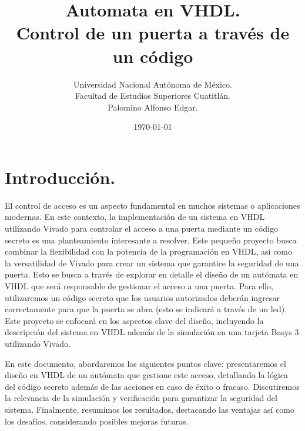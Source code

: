 \documentclass[a4paper, 12pt]{article}
\title{Automata en VHDL.\\Control de un puerta a través de un código}
\author{Universidad Nacional Autónoma de México.\\Facultad de Estudios Superiores Cuatitlán.\\Palomino Alfonso Edgar.}
\date{\today}
\begin{document}
    \maketitle  
    \vspace{2ex}

    \section{Introducción.}
    El control de acceso es un aspecto fundamental en muchos sistemas o aplicaciones modernas. En este contexto, la implementación de un sistema en VHDL utilizando Vivado para controlar el acceso a una puerta mediante un código secreto es una planteamiento interesante a resolver. Este pequeño proyecto busca combinar la flexibilidad con la potencia de la programación en VHDL, así como la versatilidad de Vivado para crear un sistema que garantice la seguridad de una puerta. Esto se busca a través de explorar en detalle el diseño de un autómata en VHDL que será responsable de gestionar el acceso a una puerta. Para ello, utilizaremos un código secreto que los usuarios autorizados deberán ingresar correctamente para que la puerta se abra (esto se indicará a través de un led). Este proyecto se enfocará en los aspectos clave del diseño, incluyendo la descripción del sistema en VHDL además de la simulación en una tarjeta Basys 3 utilizando Vivado.

    En este documento, abordaremos los siguientes puntos clave: presentaremos el diseño en VHDL de un autómata que gestione este acceso, detallando la lógica del código secreto además de las acciones en caso de éxito o fracaso. Discutiremos la relevancia de la simulación y verificación para garantizar la seguridad del sistema. Finalmente, resumimos los resultados, destacando las ventajas así como los desafíos, considerando posibles mejoras futuras.

    
\end{document}
